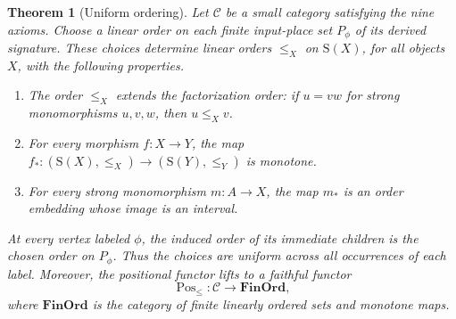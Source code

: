 \documentclass[11pt,a4paper]{article}
\theoremstyle{plain}
\newtheorem{theorem}{Theorem}[section]
\theoremstyle{definition}
\theoremstyle{remark}
\newcommand{\C}{\mathcal C}
\newcommand{\Occ}{\mathrm{S}}
\newcommand{\Pos}{\operatorname{Pos}}
\begin{document}
\begin{theorem}[Uniform ordering]\label{thm:uniform-ordering}
Let $\C$ be a small category satisfying the nine axioms. Choose a
linear order on each finite input-place set $P_\phi$ of its derived
signature. These choices determine linear orders $\le_X$ on
$\Occ(X)$, for all objects $X$, with the following properties.
\begin{enumerate}
\item The order $\le_X$ extends the factorization order:
if $u=vw$ for strong monomorphisms $u,v,w$, then $u\le_X v$.
\item For every morphism $f:X\to Y$, the map
$f_*:(\Occ(X),\le_X)\to(\Occ(Y),\le_Y)$ is monotone.
\item For every strong monomorphism $m:A\to X$, the map $m_*$
is an order embedding whose image is an interval.
\end{enumerate}
At every vertex labeled $\phi$, the induced order of its immediate
children is the chosen order on $P_\phi$. Thus the choices are uniform
across all occurrences of each label. Moreover, the positional functor
lifts to a faithful functor
\[
 \Pos_{\le}:\C\longrightarrow\mathbf{FinOrd},
\]
where $\mathbf{FinOrd}$ is the category of finite linearly ordered
sets and monotone maps.
\end{theorem}
\end{document}
